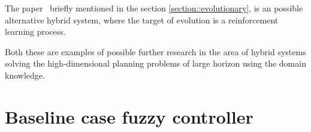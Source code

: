 \documentclass[12pt, a4paper]{report}
\begin{document}
	The paper~\cite{song2023rl_ea} briefly mentioned in the section \ref{section::evolutionary}, is an possible alternative hybrid system, where the target of evolution is a reinforcement learning process.

	Both these are examples of possible further research in the area of hybrid systems solving the high-dimensional planning problems of large horizon using the domain knowledge.
	
	\printbibliography

	\appendix
	
	\chapter{Baseline case fuzzy controller}\label{appendix::baseline-case-fuzzy-controller}
	
	
	
\end{document}
